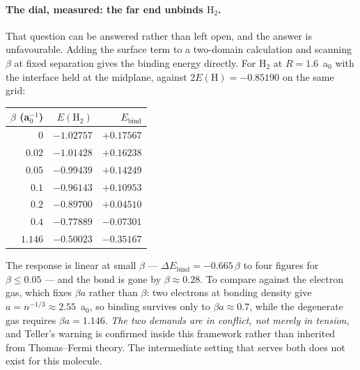 \documentclass[11pt]{article}
\begin{document}
\paragraph{The dial, measured: the far end unbinds \texorpdfstring{$\mathrm{H}_2$}{H2}.} That
question can be answered rather than left open, and the answer is unfavourable. Adding the surface
term to a two-domain calculation and scanning $\beta$ at fixed separation gives the binding energy
directly. For $\mathrm{H}_2$ at $R=1.6$~a$_0$ with the interface held at the midplane, against
$2E(\mathrm{H})=-0.85190$ on the same grid:

\begin{center}
\small
\begin{tabular}{@{}rrr@{}}
\toprule
$\beta$ (a$_0^{-1}$) & $E(\mathrm{H}_2)$ & $E_{\mathrm{bind}}$\\
\midrule
$0$      & $-1.02757$ & $+0.17567$\\
$0.02$   & $-1.01428$ & $+0.16238$\\
$0.05$   & $-0.99439$ & $+0.14249$\\
$0.1$    & $-0.96143$ & $+0.10953$\\
$0.2$    & $-0.89700$ & $+0.04510$\\
$0.4$    & $-0.77889$ & $-0.07301$\\
$1.146$  & $-0.50023$ & $-0.35167$\\
\bottomrule
\end{tabular}
\end{center}

\noindent The response is linear at small $\beta$ --- $\Delta E_{\mathrm{bind}}=-0.665\,\beta$ to four
figures for $\beta\le0.05$ --- and the bond is gone by $\beta\approx0.28$. To compare against the
electron gas, which fixes $\beta a$ rather than $\beta$: two electrons at bonding density give
$a=n^{-1/3}\approx2.55$~a$_0$, so binding survives only to $\beta a\approx0.7$, while the degenerate
gas requires $\beta a=1.146$. \emph{The two demands are in conflict, not merely in tension}, and
Teller's warning is confirmed inside this framework rather than inherited from Thomas--Fermi theory.
The intermediate setting that serves both does not exist for this molecule.
\end{document}
